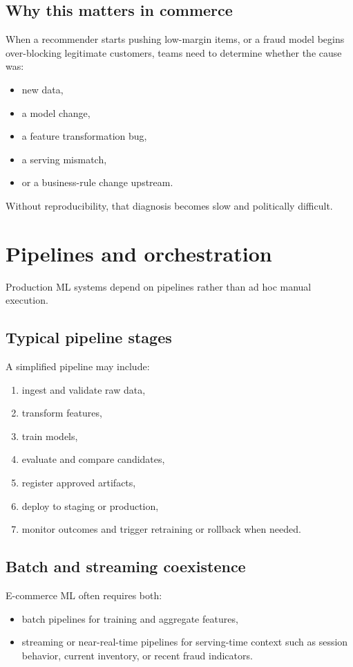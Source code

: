 \subsection{Why this matters in commerce}
When a recommender starts pushing low-margin items, or a fraud model begins over-blocking legitimate customers, teams need to determine whether the cause was:
\begin{itemize}
  \item new data,
  \item a model change,
  \item a feature transformation bug,
  \item a serving mismatch,
  \item or a business-rule change upstream.
\end{itemize}

Without reproducibility, that diagnosis becomes slow and politically difficult.

\section{Pipelines and orchestration}
Production ML systems depend on pipelines rather than ad hoc manual execution.

\subsection{Typical pipeline stages}
A simplified pipeline may include:
\begin{enumerate}
  \item ingest and validate raw data,
  \item transform features,
  \item train models,
  \item evaluate and compare candidates,
  \item register approved artifacts,
  \item deploy to staging or production,
  \item monitor outcomes and trigger retraining or rollback when needed.
\end{enumerate}

\subsection{Batch and streaming coexistence}
E-commerce ML often requires both:
\begin{itemize}
  \item batch pipelines for training and aggregate features,
  \item streaming or near-real-time pipelines for serving-time context such as session behavior, current inventory, or recent fraud indicators.
\end{itemize}

